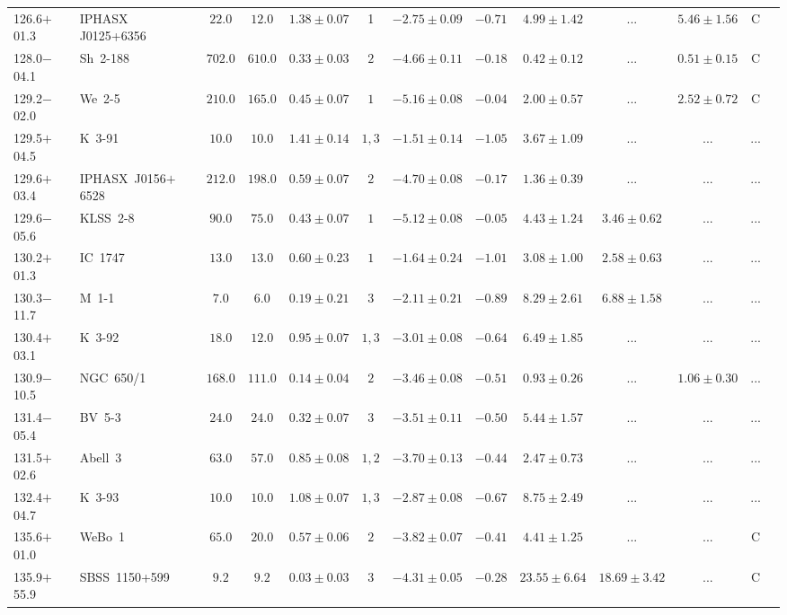\documentclass[useAMS]{mn2e}
\begin{document}
\begin{center}
{\begin{longtable}{llccccccccccc}
126.6$+$01.3	&IPHASX J0125+6356 	&	$22.0$	&$12.0$	&	$1.38 \pm 0.07$	&	1&	$-2.75 \pm 0.09$	&	$-0.71$	&	$4.99 \pm 1.42$	&	$...$	&	$5.46 \pm 1.56$	&	C	\\
128.0$-$04.1&Sh~2-188&$     702.0$&$     610.0$&$0.33 \pm 0.03$&$2$&$-4.66 \pm 0.11$&$     -0.18$&$0.42 \pm 0.12$&$...$&$0.51 \pm 0.15$&C\\
129.2$-$02.0&We~2-5&$     210.0$&$     165.0$&$0.45 \pm 0.07$&$1$&$-5.16 \pm 0.08$&$     -0.04$&$2.00 \pm 0.57$&$...$&$2.52 \pm 0.72$&C\\
129.5$+$04.5&K~3-91&$      10.0$&$      10.0$&$1.41 \pm 0.14$&$1,3$&$-1.51 \pm 0.14$&$     -1.05$&$3.67 \pm 1.09$&$...$&$...$&...\\
129.6$+$03.4& IPHASX~J0156$+$6528&$     212.0$&$     198.0$&$0.59 \pm 0.07$&$2$&$-4.70 \pm 0.08$&$     -0.17$&$1.36 \pm 0.39$&$...$&$...$&...\\
129.6$-$05.6&KLSS~2-8&$      90.0$&$      75.0$&$0.43 \pm 0.07$&$1$&$-5.12 \pm 0.08$&$     -0.05$&$4.43 \pm 1.24$&$3.46 \pm 0.62$&$...$&...\\
130.2$+$01.3&IC~1747&$      13.0$&$      13.0$&$0.60 \pm 0.23$&$1$&$-1.64 \pm 0.24$&$     -1.01$&$3.08 \pm 1.00$&$2.58 \pm 0.63$&$...$&...\\
130.3$-$11.7&M~1-1&$       7.0$&$       6.0$&$0.19 \pm 0.21$&$3$&$-2.11 \pm 0.21$&$     -0.89$&$8.29 \pm 2.61$&$6.88 \pm 1.58$&$...$&...\\
130.4$+$03.1&K~3-92&$      18.0$&$      12.0$&$0.95 \pm 0.07$&$1,3$&$-3.01 \pm 0.08$&$     -0.64$&$6.49 \pm 1.85$&$...$&$...$&...\\
130.9$-$10.5&NGC~650/1&$     168.0$&$     111.0$&$0.14 \pm 0.04$&$2$&$-3.46 \pm 0.08$&$     -0.51$&$0.93 \pm 0.26$&$...$&$1.06 \pm 0.30$&...\\
131.4$-$05.4&BV~5-3&$      24.0$&$      24.0$&$0.32 \pm 0.07$&$3$&$-3.51 \pm 0.11$&$     -0.50$&$5.44 \pm 1.57$&$...$&$...$&...\\
131.5$+$02.6&Abell~3&$      63.0$&$      57.0$&$0.85 \pm 0.08$&$1,2$&$-3.70 \pm 0.13$&$     -0.44$&$2.47 \pm 0.73$&$...$&$...$&...\\
132.4$+$04.7&K~3-93&$      10.0$&$      10.0$&$1.08 \pm 0.07$&$1,3$&$-2.87 \pm 0.08$&$     -0.67$&$8.75 \pm 2.49$&$...$&$...$&...\\
135.6$+$01.0&WeBo~1&$      65.0$&$      20.0$&$0.57 \pm 0.06$&$2$&$-3.82 \pm 0.07$&$     -0.41$&$4.41 \pm 1.25$&$...$&$...$&C\\
135.9$+$55.9&SBSS~1150+599&$       9.2$&$       9.2$&$0.03 \pm 0.03$&$3$&$-4.31 \pm 0.05$&$     -0.28$&$23.55 \pm 6.64$&$18.69 \pm 3.42$&$...$&C\\

\end{longtable}}
\end{center}
\end{document}
